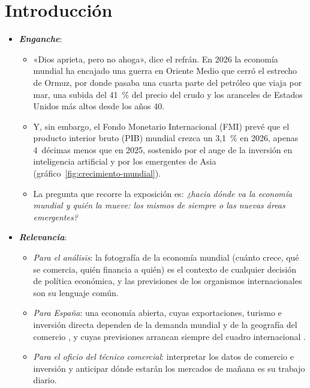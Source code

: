 \documentclass[11pt]{article}
\begin{document}
\tceetitulo

\section*{Introducción}

\begin{itemize}
\item \textbf{\emph{Enganche}}:
  \begin{itemize}
  \item «Dios aprieta, pero no ahoga», dice el refrán. En 2026 la economía mundial ha encajado una guerra en Oriente Medio que cerró el estrecho de Ormuz, por donde pasaba una cuarta parte del petróleo que viaja por mar, una subida del 41~\% del precio del crudo y los aranceles de Estados Unidos más altos desde los años 40\nocite{FMI2026WEO,BEA2026Aranceles}.
  \item Y, sin embargo, el Fondo Monetario Internacional (FMI) prevé que el producto interior bruto (PIB) mundial crezca un 3,1~\% en 2026, apenas 4~décimas menos que en 2025, sostenido por el auge de la inversión en inteligencia artificial y por los emergentes de Asia (gráfico~\ref{fig:crecimiento-mundial})\nocite{FMI2026WEO}.
  \item La pregunta que recorre la exposición es: \emph{¿hacia dónde va la economía mundial y quién la mueve: los mismos de siempre o las nuevas áreas emergentes?}
  \end{itemize}

\item \textbf{\emph{Relevancia}}:
  \begin{itemize}
  \item \emph{Para el análisis}: la fotografía de la economía mundial (cuánto crece, qué se comercia, quién financia a quién) es el contexto de cualquier decisión de política económica, y las previsiones de los organismos internacionales son su lenguaje común.
  \item \emph{Para España}: una economía abierta, cuyas exportaciones, turismo e inversión directa dependen de la demanda mundial y de la geografía del comercio  , y cuyas previsiones arrancan siempre del cuadro internacional .
  \item \emph{Para el oficio del técnico comercial}: interpretar los datos de comercio e inversión y anticipar dónde estarán los mercados de mañana es su trabajo diario.
  \end{itemize}


\end{itemize}
\end{document}

